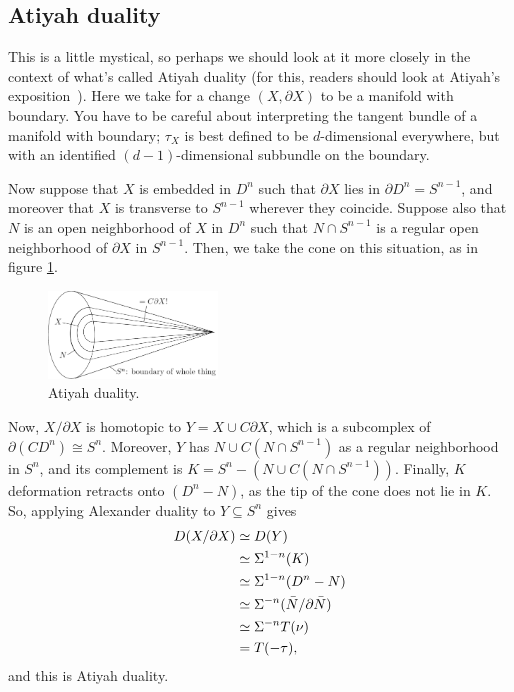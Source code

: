 \subsection*{Atiyah duality}
This is a little mystical, so perhaps we should look at it more closely in the context of what's called Atiyah duality (for this, readers should look at Atiyah's exposition~\cite{Atiyah}).  Here we take for a change $(X, \partial X)$ to be a manifold with boundary.  You have to be careful about interpreting the tangent bundle of a manifold with boundary; $\tau_X$ is best defined to be $d$-dimensional everywhere, but with an identified $(d-1)$-dimensional subbundle on the boundary.  %

Now suppose that $X$ is embedded in $D^n$ such that $\partial X$ lies in $\partial D^n=S^{n-1}$, and moreover that $X$ is transverse to $S^{n-1}$ wherever they coincide. Suppose also that $N$ is an open neighborhood of $X$ in $D^n$ such that $N\cap S^{n-1}$ is a regular open neighborhood of $\partial X$ in $S^{n-1}$. Then, we take the cone on this situation, as in figure \ref{AtiyahDuality}.
\begin{figure}[ht!]
\centering\includegraphics[width=0.4\textwidth]{figures/figure29.pdf}
\caption{\small Atiyah duality.}\label{AtiyahDuality}
\end{figure}

Now, $X / \partial X$ is homotopic to  $Y = X \cup C \partial X$, which is a subcomplex of $\partial(CD^n)\cong S^n$.  Moreover, $Y$ has $N \cup C(N \cap S^{n-1})$ as a regular neighborhood in $S^n$, and its complement is $K=S^n - (N \cup C(N \cap S^{n-1}))$.  Finally, $K$ deformation retracts onto $(D^n-N)$, as the tip of the cone does not lie in $K$. So, applying Alexander duality to $Y\subseteq S^n$ gives
\begin{align*}
D(X / \partial X) & \simeq D(Y) \\
& \simeq \Sigma^{1-n}(K) \\
& \simeq \Sigma^{1-n}(D^n - N) \\
& \simeq \Sigma^{-n}(\bar N / \partial \bar N) \\
& \simeq \Sigma^{-n} T (\nu)\\
& = T(-\tau),
\end{align*}
and this is Atiyah duality.

